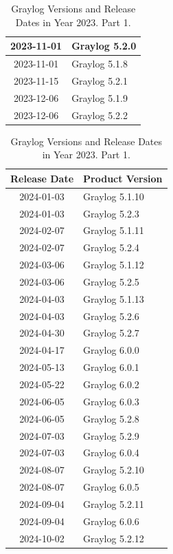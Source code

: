 \documentclass[../main.tex]{subfiles}
\begin{document}
\begin{table}[h]
\begin{minipage}{0.45\textwidth}
\begin{tabular}{|c|l|}
    2023-11-01 & Graylog 5.2.0 \\ \hline  
    2023-11-01 & Graylog 5.1.8 \\ \hline  
    2023-11-15 & Graylog 5.2.1 \\ \hline  
    2023-12-06 & Graylog 5.1.9 \\ \hline  
    2023-12-06 & Graylog 5.2.2 \\ \hline  
\end{tabular}
\caption{Graylog Versions and Release Dates in Year 2023. Part 1.}
\end{minipage}
\hspace{1cm} %
\begin{minipage}{0.45\textwidth}
\centering
\begin{tabular}{|c|l|}
\hline
\textbf{Release Date} & \textbf{Product Version} \\ \hline
    2024-01-03 & Graylog 5.1.10 \\ \hline  
    2024-01-03 & Graylog 5.2.3 \\ \hline  
    2024-02-07 & Graylog 5.1.11 \\ \hline  
    2024-02-07 & Graylog 5.2.4 \\ \hline  
    2024-03-06 & Graylog 5.1.12 \\ \hline  
    2024-03-06 & Graylog 5.2.5 \\ \hline  
    2024-04-03 & Graylog 5.1.13 \\ \hline  
    2024-04-03 & Graylog 5.2.6 \\ \hline  
    2024-04-30 & Graylog 5.2.7 \\ \hline  
    2024-04-17 & Graylog 6.0.0 \\ \hline  
    2024-05-13 & Graylog 6.0.1 \\ \hline  
    2024-05-22 & Graylog 6.0.2 \\ \hline  
    2024-06-05 & Graylog 6.0.3 \\ \hline  
    2024-06-05 & Graylog 5.2.8 \\ \hline  
    2024-07-03 & Graylog 5.2.9 \\ \hline  
    2024-07-03 & Graylog 6.0.4 \\ \hline  
    2024-08-07 & Graylog 5.2.10 \\ \hline  
    2024-08-07 & Graylog 6.0.5 \\ \hline  
    2024-09-04 & Graylog 5.2.11 \\ \hline  
    2024-09-04 & Graylog 6.0.6 \\ \hline  
    2024-10-02 & Graylog 5.2.12 \\ \hline  

\end{tabular}
\end{minipage}
\end{table}
\end{document}
